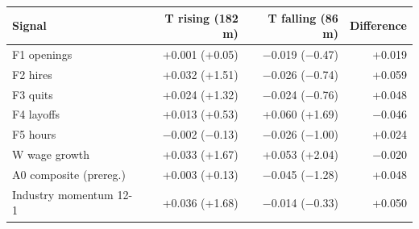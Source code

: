 \begin{tabular}{lrrr}
\toprule
Signal & T rising (182 m) & T falling (86 m) & Difference \\
\midrule
F1 openings & +0.001 (+0.05) & $-$0.019 ($-$0.47) & +0.019 \\
F2 hires & +0.032 (+1.51) & $-$0.026 ($-$0.74) & +0.059 \\
F3 quits & +0.024 (+1.32) & $-$0.024 ($-$0.76) & +0.048 \\
F4 layoffs & +0.013 (+0.53) & +0.060 (+1.69) & $-$0.046 \\
F5 hours & $-$0.002 ($-$0.13) & $-$0.026 ($-$1.00) & +0.024 \\
W wage growth & +0.033 (+1.67) & +0.053 (+2.04) & $-$0.020 \\
A0 composite (prereg.) & +0.003 (+0.13) & $-$0.045 ($-$1.28) & +0.048 \\
Industry momentum 12-1 & +0.036 (+1.68) & $-$0.014 ($-$0.33) & +0.050 \\
\bottomrule
\end{tabular}
